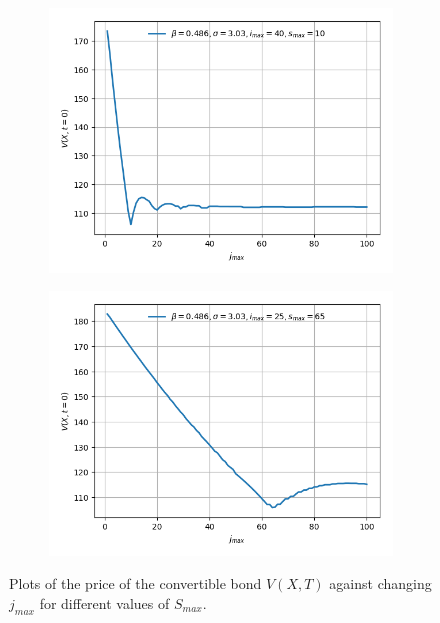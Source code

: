 \documentclass{article}
\begin{document}
\begin{figure}[!th]
\centering
\begin{subfigure}{0.45\textwidth}
    \includegraphics[width=\linewidth]{../images/smax_jmax/10_european_varying_jmax.png}
    \label{fig:varying_jmax_10}
\end{subfigure}
\hfil
\begin{subfigure}{0.45\textwidth}
    \includegraphics[width=\linewidth]{../images/smax_jmax/65_european_varying_jmax.png}
    \label{fig:varying_jmax_65}
\end{subfigure}
\caption{Plots of the price of the convertible bond $V(X,T)$ against changing $j_{max}$ for different values of $S_{max}$.}
\label{fig:varying_jmax}
\end{figure}
\end{document}
